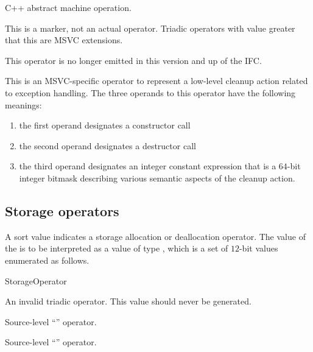 C++ abstract machine operation.

This is a marker, not an actual operator. Triadic operators with 
value greater that this are MSVC extensions.

This operator is no longer emitted in this version and up of the IFC.

This is an MSVC-specific operator to represent a low-level cleanup action related to exception handling.
The three operands to this operator have the following meanings:
\begin{enumerate}
  \item the first operand designates a constructor call
  \item the second operand designates a destructor call
  \item the third operand designates an integer constant expression that is
   a $64$-bit integer bitmask describing various semantic aspects of the cleanup action. 
\end{enumerate}


\subsection{Storage operators}
\label{sec:ifc:OperatorSort:Storage}

A sort value  indicates a storage 
allocation or deallocation operator.  The
value of the  is to be interpreted as a value of type 
, which is a set of $12$-bit values enumerated as follows.
%
\begin{Enumeration}{StorageOperator}

	\setcounter{enumi}{2013}
\end{Enumeration}

An invalid triadic operator.  This value should never be generated.

Source-level ``'' operator.

Source-level ``'' operator.

